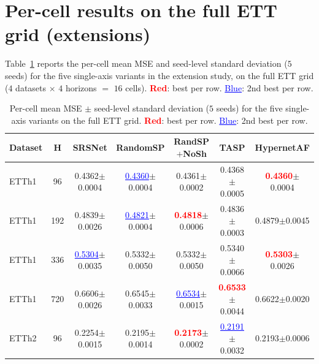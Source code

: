 \appendix

\section{Per-cell results on the full ETT grid (extensions)}
\label{app:extensions-cells}

Table~\ref{tab:ext-full-cells} reports the per-cell mean MSE and
seed-level standard deviation ($5$ seeds) for the five
single-axis variants in the extension study, on the full ETT
grid ($4$ datasets $\times$ $4$ horizons $=$ $16$ cells).
\textcolor{red}{\textbf{Red}}: best per row.
\textcolor{blue}{\underline{Blue}}: 2nd best per row.

\begin{table}[h]
  \caption{Per-cell mean MSE $\pm$ seed-level standard deviation
    ($5$ seeds) for the five single-axis variants on the full
    ETT grid. \textcolor{red}{\textbf{Red}}: best per row.
    \textcolor{blue}{\underline{Blue}}: 2nd best per row.}
  \label{tab:ext-full-cells}
  \begin{center}
  \scriptsize
  \setlength{\tabcolsep}{2.5pt}
  \begin{tabular}{l|c|ccccc}
    \toprule
    Dataset & H & SRSNet & RandomSP & RandSP$+$NoSh & TASP & HypernetAF \\
    \midrule
    ETTh1 & 96  & 0.4362{\scriptsize $\pm$0.0004} & \textcolor{blue}{\underline{0.4360}}{\scriptsize $\pm$0.0004} & 0.4361{\scriptsize $\pm$0.0002} & 0.4368{\scriptsize $\pm$0.0005} & \textcolor{red}{\textbf{0.4360}}{\scriptsize $\pm$0.0004} \\
    ETTh1 & 192 & 0.4839{\scriptsize $\pm$0.0026} & \textcolor{blue}{\underline{0.4821}}{\scriptsize $\pm$0.0004} & \textcolor{red}{\textbf{0.4818}}{\scriptsize $\pm$0.0006} & 0.4836{\scriptsize $\pm$0.0003} & 0.4879{\scriptsize $\pm$0.0045} \\
    ETTh1 & 336 & \textcolor{blue}{\underline{0.5304}}{\scriptsize $\pm$0.0035} & 0.5332{\scriptsize $\pm$0.0050} & 0.5332{\scriptsize $\pm$0.0050} & 0.5340{\scriptsize $\pm$0.0066} & \textcolor{red}{\textbf{0.5303}}{\scriptsize $\pm$0.0026} \\
    ETTh1 & 720 & 0.6606{\scriptsize $\pm$0.0026} & 0.6545{\scriptsize $\pm$0.0033} & \textcolor{blue}{\underline{0.6534}}{\scriptsize $\pm$0.0015} & \textcolor{red}{\textbf{0.6533}}{\scriptsize $\pm$0.0044} & 0.6622{\scriptsize $\pm$0.0020} \\
    \midrule
    ETTh2 & 96  & 0.2254{\scriptsize $\pm$0.0015} & 0.2195{\scriptsize $\pm$0.0014} & \textcolor{red}{\textbf{0.2173}}{\scriptsize $\pm$0.0002} & \textcolor{blue}{\underline{0.2191}}{\scriptsize $\pm$0.0032} & 0.2193{\scriptsize $\pm$0.0006} \\

\end{tabular}
\end{center}
\end{table}

